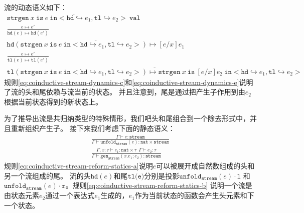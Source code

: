流的动态语义如下：
\begin{subequations} \label{eq:coinductive-stream-dynamics}
	\begin{gather}
	\overline{\texttt{strgen}\ x\ \texttt{is}\ e\ \texttt{in} <\texttt{hd}\hookrightarrow e_1,
	\texttt{tl}\hookrightarrow e_2>\ \texttt{val}} \label{eq:coinductive-stream-dynamics-a} \\
	\frac{e\mapsto e'}{\texttt{hd}(e)\mapsto \texttt{hd}(e')} \label{eq:coinductive-stream-dynamics-b} \\
	\overline{\texttt{hd}(\texttt{strgen}\ x\ \texttt{is}\ e\ \texttt{in} <\texttt{hd}\hookrightarrow e_1,
		\texttt{tl}\hookrightarrow e_2>)\mapsto[e/x]e_1} \label{eq:coinductive-stream-dynamics-c} \\
	\frac{e\mapsto e'}{\texttt{tl}(e)\mapsto \texttt{tl}(e')} \label{eq:coinductive-stream-dynamics-d} \\
	\overline{\texttt{tl}(\texttt{strgen}\ x\ \texttt{is}\ e\ \texttt{in} <\texttt{hd}\hookrightarrow e_1,
		\texttt{tl}\hookrightarrow e_2>)\mapsto \texttt{strgen}\ x\ \texttt{is}\ [e/x]e_2 \ \texttt{in} <\texttt{hd}\hookrightarrow e_1,\texttt{tl}\hookrightarrow e_2>}\label{eq:coinductive-stream-dynamics-e}
	\end{gather}
\end{subequations}
规则\ref{eq:coinductive-stream-dynamics-c}和\ref{eq:coinductive-stream-dynamics-e}说明了流的头和尾依赖与流当前的状态。
并且注意到，尾是通过把产生子作用到由$e_2$根据当前状态得到的新状态上。

为了推导出流是共归纳类型的特殊情形，我们吧头和尾组合到一个除去形式中，并且重新组织产生子。
接下来我们考虑下面的静态语义：
\begin{subequations}\label{eq:coinductive-stream-reform-statics}
	\begin{gather}
	\frac{\Gamma\vdash e:\texttt{stream}}
	{\Gamma\vdash\texttt{unfold}_\texttt{stream}(e):\texttt{nat}\times\texttt{stream}} \label{eq:coinductive-stream-reform-statics-a}\\
	\frac{\Gamma,x:\tau\vdash e_1:\texttt{nat}\times \tau\ \ \Gamma\vdash e_2:\tau}
	{\Gamma\vdash\texttt{gen}_\texttt{stream}(x.e_1;e_2):\texttt{stream}}\label{eq:coinductive-stream-reform-statics-b}
	\end{gather}
\end{subequations}
规则\ref{eq:coinductive-stream-reform-statics-a}说明$e$可以被展开成自然数组成的头和另一个流组成的尾。
流的头$\texttt{hd}(e)$和尾$\texttt{tl(e)}$分别是投影$\texttt{unfold}_\texttt{stream}(e)\cdot\texttt{l}$
和$\texttt{unfold}_\texttt{stream}(e)\cdot\texttt{r}$。规则\ref{eq:coinductive-stream-reform-statics-b}
说明一个流是由状态元素$e_2$通过一个表达式$e_1$生成的，$e_1$作为当前状态的函数会产生头元素和下一个状态。

